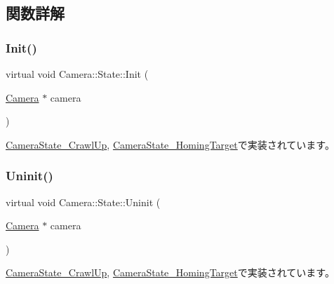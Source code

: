 \subsection{関数詳解}
\mbox{\label{class_camera_1_1_state_aa1b81471ab15e64b3117ffe7de9560ff}} 
\subsubsection{\texorpdfstring{Init()}{Init()}}
{\footnotesize\ttfamily virtual void Camera\+::\+State\+::\+Init (\begin{DoxyParamCaption}\item[{\mbox{\hyperlink{class_camera}{Camera}} $\ast$}]{camera }\end{DoxyParamCaption})\hspace{0.3cm}{\ttfamily [pure virtual]}}



\mbox{\hyperlink{class_camera_state___crawl_up_a43a47eb4e7445c6801e8316c5a635709}{Camera\+State\+\_\+\+Crawl\+Up}}, \mbox{\hyperlink{class_camera_state___homing_target_a9222190a5f26d564e99623b05941d382}{Camera\+State\+\_\+\+Homing\+Target}}で実装されています。

\mbox{\label{class_camera_1_1_state_a68ebfc3f15cae24b342cb5dae57497cf}} 
\subsubsection{\texorpdfstring{Uninit()}{Uninit()}}
{\footnotesize\ttfamily virtual void Camera\+::\+State\+::\+Uninit (\begin{DoxyParamCaption}\item[{\mbox{\hyperlink{class_camera}{Camera}} $\ast$}]{camera }\end{DoxyParamCaption})\hspace{0.3cm}{\ttfamily [pure virtual]}}



\mbox{\hyperlink{class_camera_state___crawl_up_ac9822b09d8e5fa9e1def7ac8a1e9c893}{Camera\+State\+\_\+\+Crawl\+Up}}, \mbox{\hyperlink{class_camera_state___homing_target_a5b4abde99047da6a20f299990c259ef1}{Camera\+State\+\_\+\+Homing\+Target}}で実装されています。

